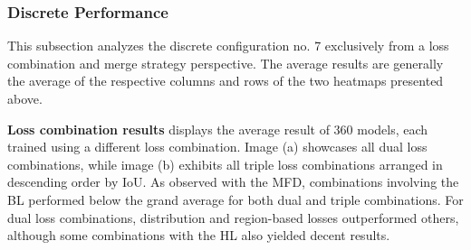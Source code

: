 \subsubsection*{Discrete Performance}
This subsection analyzes the discrete configuration no. 7 exclusively from a loss combination and merge strategy perspective. The average results are generally the average of the respective columns and rows of the two heatmaps presented above.

\textbf{Loss combination results}\newline
{} displays the average result of 360 models, each trained using a different loss combination. Image (a) showcases all dual loss combinations, while image (b) exhibits all triple loss combinations arranged in descending order by \ac{IoU}. As observed with the \ac{MFD}, combinations involving the \ac{BL} performed below the grand average for both dual and triple combinations. For dual loss combinations, distribution and region-based losses outperformed others, although some combinations with the \ac{HL} also yielded decent results.
